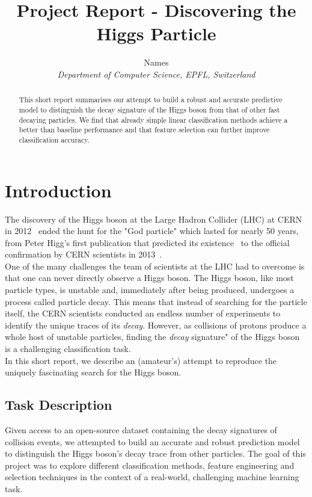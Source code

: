 \documentclass[10pt,conference,compsocconf]{IEEEtran}
\begin{document}
\title{Project Report - Discovering the Higgs Particle}

\author{
  Names\\
  \textit{Department of Computer Science, EPFL, Switzerland}
}

\maketitle

\begin{abstract}
This short report summarises our attempt to build a robust and accurate predictive model to distinguish the decay signature of the Higgs boson from that of other fast decaying particles. We find that already simple linear classification methods achieve a better than baseline performance and that feature selection can further improve classification accuracy.
\end{abstract}


\section{Introduction}

The discovery of the Higgs boson at the Large Hadron Collider (LHC) at CERN in 2012~\cite{Aad2012} ended the hunt for the "God particle" which lasted for nearly 50 years, from Peter Higg's first publication that predicted its existence~\cite{Higgs1964} to the official confirmation by CERN scientists in 2013~\cite{CERN}.\\
One of the many challenges the team of scientists at the LHC had to overcome is that one can never directly observe a Higgs boson. The Higgs boson, like most particle types, is unstable and, immediately after being produced, undergoes a process called particle decay. This means that instead of searching for the particle itself, the CERN scientists conducted an endless number of experiments to identify the unique traces of its \emph{decay}. However, as collisions of protons produce a whole host of unstable particles, finding the \emph{decay} signature" of the Higgs boson is a challenging classification task.\\
In this short report, we describe an (amateur's) attempt to reproduce the uniquely fascinating search for the Higgs boson.

\subsection{Task Description}
Given access to an open-source dataset containing the decay signatures of collision events, we attempted to build an accurate and robust prediction model to distinguish the Higgs boson's decay trace from other particles. The goal of this project was to explore different classification methods, feature engineering and selection techniques in the context of a real-world, challenging machine learning task. 
\end{document}
